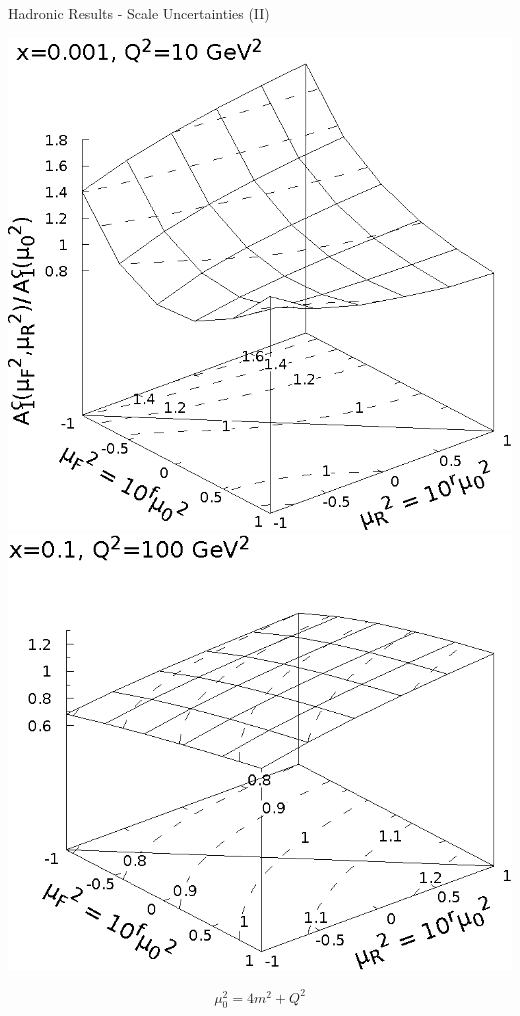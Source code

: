 \begin{frame}{Hadronic Results - Scale Uncertainties (II)}
\begin{center}
\includegraphics[width=.48\textwidth]{img/A1-muF2-muR2-x_3-q2_1}
\includegraphics[width=.48\textwidth]{img/A1-muF2-muR2-x_1-q2_2}
\end{center}
\[\mu_0^2=4m^2+Q^2\]
\end{frame}
